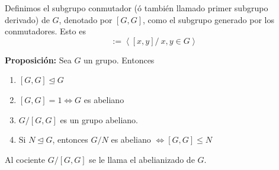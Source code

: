 \documentclass{article}
\begin{document}
Definimos el subgrupo conmutador (ó también llamado primer subgrupo derivado) de $G$, denotado por $[G,G]$, como el subgrupo generado por los conmutadores. Esto es
\begin{equation*}
[G,G]:=\left\langle [x,y]/\:x,y\in G\right\rangle
\end{equation*}

\textbf{Proposición:} Sea $G$ un grupo. Entonces
\begin{enumerate}[\bfseries (i)]
\item $[G,G]\unlhd G$

\item $[G,G]=1\Leftrightarrow G$ es abeliano

\item $G/[G,G]$ es un grupo abeliano.

\item Si $N\unlhd G$, entonces $G/N$ es abeliano $\Leftrightarrow [G,G]\leq N$
\end{enumerate}

Al cociente $G/[G,G]$ se le llama el abelianizado de $G$. \\
\end{document}
